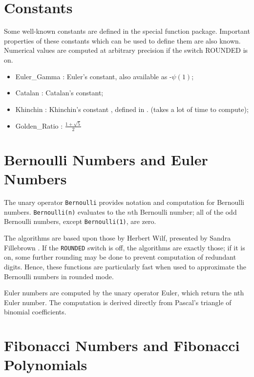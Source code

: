\documentclass[11pt]{article}
\begin{document}
\section{Constants}

Some well-known constants are defined in the special function package.
Important properties of these constants which can be used to define them
are also known. Numerical values are computed  at arbitrary precision
if the switch ROUNDED is on.

\begin{itemize}
\item Euler\_Gamma : Euler's constant, also available as -$\psi(1)$;
\item Catalan : Catalan's constant;
\item Khinchin : Khinchin's constant , defined in  \cite{Khinchin:64}.
 (takes a lot of time to compute);
\item Golden\_Ratio : $\frac{1 + \sqrt{5}}{2}$ 
\end{itemize}


\section{Bernoulli Numbers and Euler Numbers}

The unary operator {\tt Bernoulli} provides notation and computation for
Bernoulli numbers.  {\tt Bernoulli(n)} evaluates to the $n$th Bernoulli
number; all of the odd Bernoulli numbers, except {\tt Bernoulli(1)}, are
zero.

The algorithms are based upon those by Herbert Wilf, presented by Sandra
Fillebrown \cite{Fillebrown:92}.  If the {\tt ROUNDED} switch is off,
the algorithms are exactly those; if it is on, some further rounding may
be done to prevent computation of redundant digits.  Hence, these
functions are particularly fast when used to approximate the Bernoulli
numbers in rounded mode.

Euler numbers are computed by the unary operator Euler, which
return the nth Euler number. The computation is derived 
directly from Pascal's triangle of binomial coefficients.
 

\section{Fibonacci Numbers and Fibonacci Polynomials}
\end{document}
